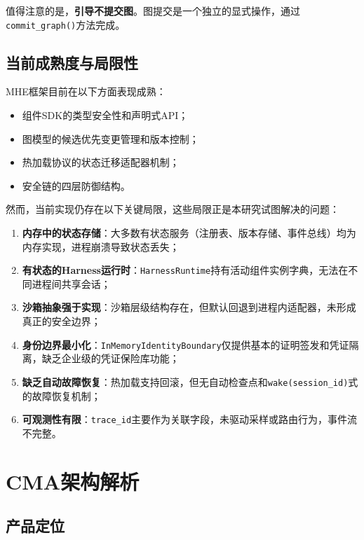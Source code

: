 \documentclass[12pt,a4paper]{ctexart}
\begin{document}
值得注意的是，\textbf{引导不提交图}。图提交是一个独立的显式操作，通过\texttt{commit\_graph()}方法完成。

\subsection{当前成熟度与局限性}

MHE框架目前在以下方面表现成熟：

\begin{itemize}
    \item 组件SDK的类型安全性和声明式API；
    \item 图模型的候选优先变更管理和版本控制；
    \item 热加载协议的状态迁移适配器机制；
    \item 安全链的四层防御结构。
\end{itemize}

然而，当前实现仍存在以下关键局限，这些局限正是本研究试图解决的问题：

\begin{enumerate}
    \item \textbf{内存中的状态存储}：大多数有状态服务（注册表、版本存储、事件总线）均为内存实现，进程崩溃导致状态丢失；
    \item \textbf{有状态的Harness运行时}：\texttt{HarnessRuntime}持有活动组件实例字典，无法在不同进程间共享会话；
    \item \textbf{沙箱抽象强于实现}：沙箱层级结构存在，但默认回退到进程内适配器，未形成真正的安全边界；
    \item \textbf{身份边界最小化}：\texttt{InMemoryIdentityBoundary}仅提供基本的证明签发和凭证隔离，缺乏企业级的凭证保险库功能；
    \item \textbf{缺乏自动故障恢复}：热加载支持回滚，但无自动检查点和\texttt{wake(session\_id)}式的故障恢复机制；
    \item \textbf{可观测性有限}：\texttt{trace\_id}主要作为关联字段，未驱动采样或路由行为，事件流不完整。
\end{enumerate}

\section{CMA架构解析}\label{sec:cma}

\subsection{产品定位}
\end{document}
